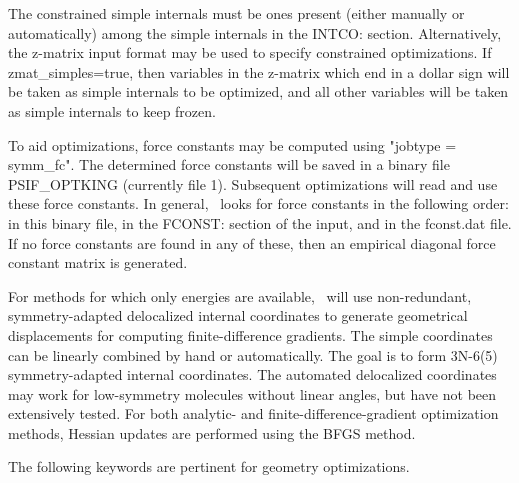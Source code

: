 The constrained simple internals must be ones present (either manually or
automatically) among the simple internals in the INTCO: section.  Alternatively,
the z-matrix input format may be used to specify constrained optimizations.
If zmat\_simples=true, then variables in the z-matrix which end in
a dollar sign will be taken as simple internals to be optimized, and
all other variables will be taken as simple internals to keep frozen.

To aid optimizations, force constants may be computed using "jobtype = symm\_fc".
The determined force constants will be saved in a binary file PSIF\_OPTKING
(currently file 1).  Subsequent optimizations will read and use these force
constants.  In general, \PSIthree\ looks for force constants in the following
order: in this binary file, in the FCONST: section of the input, and in the fconst.dat
file.  If no force constants are found in any of these, then an empirical 
diagonal force constant matrix is generated.

For methods for which only energies are available, \PSIthree\ will use non-redundant,
symmetry-adapted delocalized internal coordinates to generate geometrical
displacements for computing finite-difference gradients. The simple
coordinates can be linearly combined by hand or automatically.  The goal
is to form 3N-6(5) symmetry-adapted internal coordinates.  The automated
delocalized coordinates may work for low-symmetry molecules without
linear angles, but have not been extensively tested.  For both analytic-
and finite-difference-gradient optimization methods, Hessian updates are
performed using the BFGS method.

The following keywords are pertinent for geometry optimizations.

